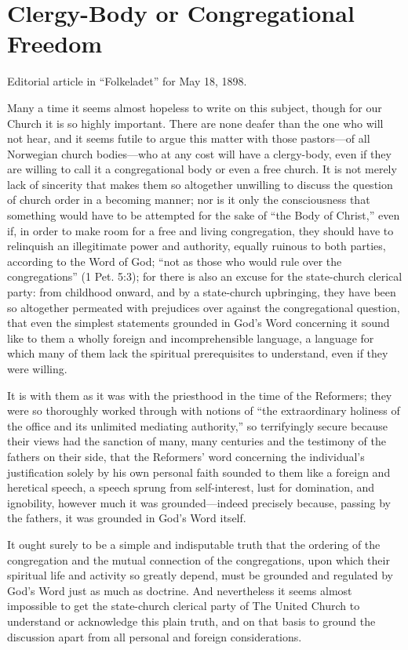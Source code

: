 
\section{Clergy-Body or Congregational Freedom}

Editorial article in “Folkeladet” for May 18, 1898.

Many a time it seems almost hopeless to write on this subject, though for our Church it is so highly important. There are none deafer than the one who will not hear, and it seems futile to argue this matter with those pastors—of all Norwegian church bodies—who at any cost will have a clergy-body, even if they are willing to call it a congregational body or even a free church. It is not merely lack of sincerity that makes them so altogether unwilling to discuss the question of church order in a becoming manner; nor is it only the consciousness that something would have to be attempted for the sake of “the Body of Christ,” even if, in order to make room for a free and living congregation, they should have to relinquish an illegitimate power and authority, equally ruinous to both parties, according to the Word of God; “not as those who would rule over the congregations” (1 Pet. 5:3); for there is also an excuse for the state-church clerical party: from childhood onward, and by a state-church upbringing, they have been so altogether permeated with prejudices over against the congregational question, that even the simplest statements grounded in God’s Word concerning it sound like to them a wholly foreign and incomprehensible language, a language for which many of them lack the spiritual prerequisites to understand, even if they were willing.

It is with them as it was with the priesthood in the time of the Reformers; they were so thoroughly worked through with notions of “the extraordinary holiness of the office and its unlimited mediating authority,” so terrifyingly secure because their views had the sanction of many, many centuries and the testimony of the fathers on their side, that the Reformers’ word concerning the individual’s justification solely by his own personal faith sounded to them like a foreign and heretical speech, a speech sprung from self-interest, lust for domination, and ignobility, however much it was grounded—indeed precisely because, passing by the fathers, it was grounded in God’s Word itself.

It ought surely to be a simple and indisputable truth that the ordering of the congregation and the mutual connection of the congregations, upon which their spiritual life and activity so greatly depend, must be grounded and regulated by God’s Word just as much as doctrine. And nevertheless it seems almost impossible to get the state-church clerical party of The United Church to understand or acknowledge this plain truth, and on that basis to ground the discussion apart from all personal and foreign considerations.

